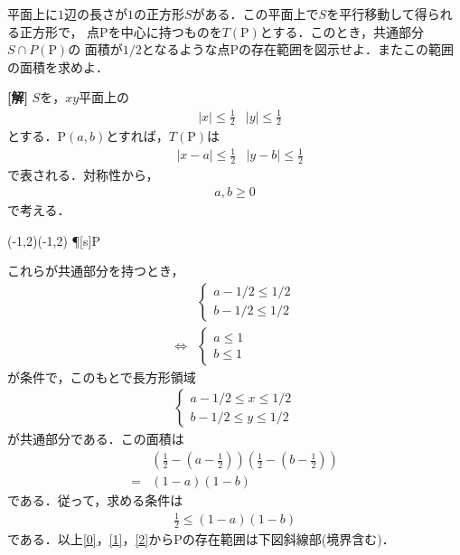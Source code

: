 \documentclass[a4j]{jarticle}
\begin{document}

     \begin{oframed}
     平面上に$1$辺の長さが$1$の正方形$S$がある．この平面上で$S$を平行移動して得られる正方形で，
     点Pを中心に持つものを$T(\mathrm{P})$とする．このとき，共通部分$S\cap P(\mathrm{P})$の
     面積が$1/2$となるような点Pの存在範囲を図示せよ．またこの範囲の面積を求めよ．
     \end{oframed}

\setlength{\columnseprule}{0.4pt}
\begin{multicols}{2}
{\bf[解]} $S$を，$xy$平面上の
     \begin{align*}
     &|x|\le\frac{1}{2}&|y|\le\frac{1}{2}
     \end{align*}
とする．P$(a,b)$とすれば，$T(\mathrm{P})$は
     \begin{align*}
     &|x-a|\le\frac{1}{2}&|y-b|\le\frac{1}{2}
     \end{align*} 
で表される．対称性から，
     \begin{align}
     a,b\ge0\label{0}
     \end{align}
で考える．

     \begin{zahyou}[ul=10mm](-1,2)(-1,2)
     \Put\P[s]{P}
     \kuromaru{\P}
     \end{zahyou}


これらが共通部分を持つとき，
     \begin{align}
          &\begin{cases}
          a-1/2\le1/2 \\
          b-1/2\le1/2
          \end{cases}\nonumber\\
     \Longleftrightarrow
         &\begin{cases}
          a\le 1 \\
          b\le 1
          \end{cases}\label{1}          
     \end{align}
が条件で，このもとで長方形領域
     \begin{align*}
          \begin{cases}
          a-1/2\le x\le1/2 \\
          b-1/2\le y\le1/2
          \end{cases}
     \end{align*}
が共通部分である．この面積は
     \begin{align*}
     &\left(\frac{1}{2}-\left(a-\frac{1}{2}\right)\right)\left(\frac{1}{2}-\left(b-\frac{1}{2}\right)\right) \\
     =&(1-a)(1-b)
     \end{align*}
 である．従って，求める条件は
      \begin{align}
      \frac{1}{2}\le (1-a)(1-b)\label{2}
      \end{align}
 である．以上\eqref{0}，\eqref{1}，\eqref{2}からPの存在範囲は下図斜線部(境界含む)．


\end{multicols}
\end{document}
